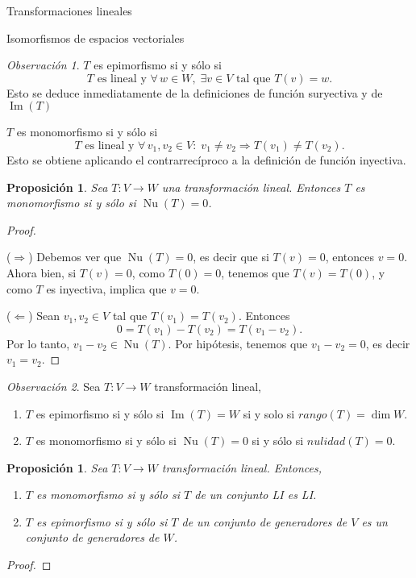 \documentclass[a4paper,12pt,twoside,spanish,reqno]{amsbook}
\newtheorem{proposicion}[teorema]{Proposici\'on}
\theoremstyle{definition}
\theoremstyle{remark}
\newtheorem{obs}{Observaci\'on}[section]
\newcommand{\img}{\operatorname{Im}}
\newcommand{\nuc}{\operatorname{Nu}}
\begin{document}
\begin{chapter}{Transformaciones lineales}
\begin{section}{Isomorfismos de espacios vectoriales}
		\begin{obs}
			$T$  es epimorfismo si y sólo si 
			$$
			\text{$T$ es lineal y }\forall\, w \in W, \; \exists v \in V \text{ tal que }T(v)=w.
			$$
			Esto se deduce inmediatamente de la definiciones de función suryectiva y de $\img(T)$
			
			$T$ es monomorfismo si y sólo si 
			$$
				\text{$T$ es lineal y }\forall\, v_1,v_2  \in V: \; v_1 \ne v_2 \Rightarrow T(v_1) \not= T(v_2).
			$$ 
			Esto se obtiene aplicando el contrarrecíproco a la definición de función inyectiva.
		\end{obs}	
		
		
			
		\begin{proposicion}\label{inyectiva-sii-nuT=0}
			Sea $T:V \to W$ una transformación lineal. Entonces $T$ es monomorfismo si y sólo si $\nuc(T) =0$.
		\end{proposicion}	
		\begin{proof} 
			
			\
			
			($\Rightarrow$) Debemos ver que  $\nuc(T)=0$,  es decir que si $T(v)=0$,  entonces  $v=0$. Ahora bien,  si $T(v) = 0$, como  $T(0)=0$, tenemos que $T(v)  = T(0)$, y como $T$ es inyectiva, implica que $v =0$.
			
			($\Leftarrow$) Sean  $v_1,v_2 \in V$ tal que $T(v_1)=T(v_2)$. Entonces 
			$$
			0 = T(v_1)- T(v_2) = T(v_1 -v_2).
			$$
			Por  lo tanto, $v_1 -v_2 \in \nuc(T)$. Por hipótesis, tenemos que $v_1 -v_2 =0$,  es decir $v_1 = v_2$.
		\end{proof}
		
		
		\begin{obs} Sea $T: V \to W$ transformación lineal, 
			\begin{enumerate}
				\item $T$  es {epimorfismo} si y sólo  si $\img(T) = W$ si  y solo si $rango(T) = \dim W$.
				\item $T$ es {monomorfismo} si y sólo  si $\nuc(T) = 0$ si y sólo si $nulidad(T) =0$.
			\end{enumerate}  
		\end{obs}		
		
		\begin{proposicion}\label{prop-T-mono-sii-li-2-li} Sea $T:V \to W$ transformación lineal. Entonces,
			\begin{enumerate}
				\item $T$ es monomorfismo si y sólo si $T$ de un conjunto LI  es  LI.
				\item $T$ es epimorfismo si y sólo si $T$ de un conjunto de generadores de $V$ es un conjunto de generadores de $W$.
			\end{enumerate}
		\end{proposicion}
		\begin{proof}
			

\end{proof}
\end{section}
\end{chapter}
\end{document}
